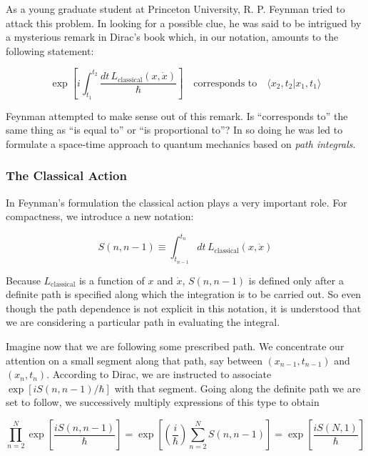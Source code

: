 \documentclass[11pt,a4paper]{article}
\begin{document}
As a young graduate student at Princeton University, R. P. Feynman tried to attack this problem. In looking for a possible clue, he was said to be intrigued by a mysterious remark in Dirac's book which, in our notation, amounts to the following statement:

\begin{equation*}
\exp\left[i\int_{t_1}^{t_2}\frac{dt\,L_{\text{classical}}(x, \dot{x})}{\hbar}\right] \quad \text{corresponds to} \quad \langle x_2, t_2|x_1, t_1\rangle
\end{equation*}

Feynman attempted to make sense out of this remark. Is ``corresponds to'' the same thing as ``is equal to'' or ``is proportional to''? In so doing he was led to formulate a space-time approach to quantum mechanics based on \textit{path integrals}.

\subsubsection{The Classical Action}

In Feynman's formulation the classical action plays a very important role. For compactness, we introduce a new notation:

\begin{equation}
S(n, n-1) \equiv \int_{t_{n-1}}^{t_n} dt\,L_{\text{classical}}(x, \dot{x})
\tag{2.300}
\end{equation}

Because $L_{\text{classical}}$ is a function of $x$ and $\dot{x}$, $S(n, n-1)$ is defined only after a definite path is specified along which the integration is to be carried out. So even though the path dependence is not explicit in this notation, it is understood that we are considering a particular path in evaluating the integral.

Imagine now that we are following some prescribed path. We concentrate our attention on a small segment along that path, say between $(x_{n-1}, t_{n-1})$ and $(x_n, t_n)$. According to Dirac, we are instructed to associate $\exp[iS(n, n-1)/\hbar]$ with that segment. Going along the definite path we are set to follow, we successively multiply expressions of this type to obtain

\begin{equation}
\prod_{n=2}^{N}\exp\left[\frac{iS(n, n-1)}{\hbar}\right] = \exp\left[\left(\frac{i}{\hbar}\right)\sum_{n=2}^{N}S(n, n-1)\right] = \exp\left[\frac{iS(N, 1)}{\hbar}\right]
\tag{2.301}
\end{equation}
\end{document}
